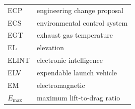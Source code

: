 \documentclass[
]{book}
\begin{document}
\begin{longtable}[]{@{}ll@{}}
\begin{minipage}[t]{0.47\columnwidth}
ECP\strut
\end{minipage} & \begin{minipage}[t]{0.47\columnwidth}\raggedright
engineering change proposal\strut
\end{minipage}\tabularnewline
\begin{minipage}[t]{0.47\columnwidth}\raggedright
ECS\strut
\end{minipage} & \begin{minipage}[t]{0.47\columnwidth}\raggedright
environmental control system\strut
\end{minipage}\tabularnewline
\begin{minipage}[t]{0.47\columnwidth}\raggedright
EGT\strut
\end{minipage} & \begin{minipage}[t]{0.47\columnwidth}\raggedright
exhaust gas temperature\strut
\end{minipage}\tabularnewline
\begin{minipage}[t]{0.47\columnwidth}\raggedright
EL\strut
\end{minipage} & \begin{minipage}[t]{0.47\columnwidth}\raggedright
elevation\strut
\end{minipage}\tabularnewline
\begin{minipage}[t]{0.47\columnwidth}\raggedright
ELINT\strut
\end{minipage} & \begin{minipage}[t]{0.47\columnwidth}\raggedright
electronic intelligence\strut
\end{minipage}\tabularnewline
\begin{minipage}[t]{0.47\columnwidth}\raggedright
ELV\strut
\end{minipage} & \begin{minipage}[t]{0.47\columnwidth}\raggedright
expendable launch vehicle\strut
\end{minipage}\tabularnewline
\begin{minipage}[t]{0.47\columnwidth}\raggedright
EM\strut
\end{minipage} & \begin{minipage}[t]{0.47\columnwidth}\raggedright
electromagnetic\strut
\end{minipage}\tabularnewline
\begin{minipage}[t]{0.47\columnwidth}\raggedright
\(E_{\mathrm{max}}\)\strut
\end{minipage} & \begin{minipage}[t]{0.47\columnwidth}\raggedright
maximum lift-to-drag ratio\strut

\end{minipage}
\end{longtable}
\end{document}
